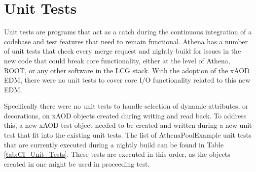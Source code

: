 \section{Unit Tests}
\label{sec:Mod_utests_CI}
Unit tests are programs that act as a catch during the continuous integration of a codebase and test features that need to remain functional. 
Athena has a number of unit tests that check every merge request and nightly build for issues in the new code that could break core functionality, either at the level of Athena, ROOT, or any other software in the LCG stack.
With the adoption of the xAOD EDM, there were no unit tests to cover core I/O functionality related to this new EDM. 

Specifically there were no unit tests to handle selection of dynamic attributes, or decorations, on xAOD objects created during writing and read back.
To address this, a new xAOD test object needed to be created and written during a new unit test that fit into the existing unit tests.
The list of AthenaPoolExample unit tests that are currently executed during a nightly build can be found in Table \ref{tab:CI_Unit_Tests}.
These tests are executed in this order, as the objects created in one might be used in proceeding test.

\begin{table}[h]
    \centering
    \caption{List of unit tests in the AthenaPoolExample package that are currently executed during a nightly build.}
    \label{tab:CI_Unit_Tests}
\end{table}

